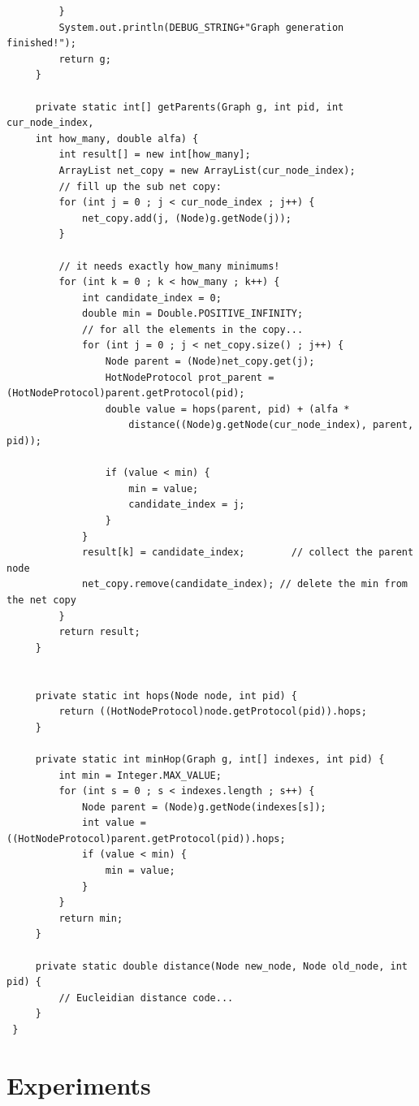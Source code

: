 \documentclass[a4paper,12pt]{article}
\begin{document}
\begin{verbatim}
         }
         System.out.println(DEBUG_STRING+"Graph generation finished!");
         return g;
     }
     
     private static int[] getParents(Graph g, int pid, int cur_node_index,
     int how_many, double alfa) {
         int result[] = new int[how_many];
         ArrayList net_copy = new ArrayList(cur_node_index);
         // fill up the sub net copy:
         for (int j = 0 ; j < cur_node_index ; j++) {
             net_copy.add(j, (Node)g.getNode(j));
         }
         
         // it needs exactly how_many minimums!
         for (int k = 0 ; k < how_many ; k++) {
             int candidate_index = 0;
             double min = Double.POSITIVE_INFINITY;
             // for all the elements in the copy...
             for (int j = 0 ; j < net_copy.size() ; j++) {
                 Node parent = (Node)net_copy.get(j);
                 HotNodeProtocol prot_parent = (HotNodeProtocol)parent.getProtocol(pid);
                 double value = hops(parent, pid) + (alfa * 
                     distance((Node)g.getNode(cur_node_index), parent, pid));
             
                 if (value < min) {
                     min = value;
                     candidate_index = j;
                 }
             }
             result[k] = candidate_index;        // collect the parent node
             net_copy.remove(candidate_index); // delete the min from the net copy 
         }
         return result;
     }
     
 
     private static int hops(Node node, int pid) {
         return ((HotNodeProtocol)node.getProtocol(pid)).hops;
     }
     
     private static int minHop(Graph g, int[] indexes, int pid) {
         int min = Integer.MAX_VALUE; 
         for (int s = 0 ; s < indexes.length ; s++) {
             Node parent = (Node)g.getNode(indexes[s]);
             int value = ((HotNodeProtocol)parent.getProtocol(pid)).hops;
             if (value < min) {
                 min = value;
             }   
         }
         return min;
     }
      
     private static double distance(Node new_node, Node old_node, int pid) {
         // Eucleidian distance code...
     } 
 }
\end{verbatim}
\normalsize

\section{Experiments}
\end{document}
